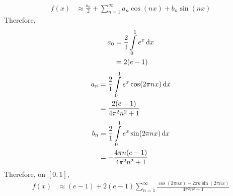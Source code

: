 \documentclass[fleqn, a4paper, 11pt, oneside]{amsart}
\theoremstyle{definition}
\theoremstyle{theorem}
\begin{document}
\begin{solution}
	\begin{align*}
		f(x) &\approx \frac{a_0}{2} + \sum\limits_{n = 1}^{\infty} a_n \cos(n x) + b_n \sin(n x)
	\end{align*}
	Therefore,
	\begin{align*}
		a_0 &= \frac{2}{1} \int\limits_{0}^{1} e^x \dif x\\
		&= 2 (e - 1)
	\end{align*}
	\begin{align*}
		a_n &= \frac{2}{1} \int\limits_{0}^{1} e^x \cos(2 \pi n x) \dif x\\
		&= \frac{2 (e - 1)}{4 \pi^2 n^2 + 1}
	\end{align*}
	\begin{align*}
		b_n &= \frac{2}{1} \int\limits_{0}^{1} e^x \sin(2 \pi n x) \dif x\\
		&= -\frac{4 \pi n (e - 1)}{4 \pi^2 n^2 + 1}
	\end{align*}
	Therefore, on $[0,1]$,
	\begin{align*}
		f(x) &\approx (e - 1) + 2 (e - 1) \sum\limits_{n = 1}^{\infty} \frac{\cos(2 \pi n x) - 2 \pi n \sin(2 \pi n x)}{4 \pi^2 n^2 + 1}
	\end{align*}
\end{solution}
\end{document}
